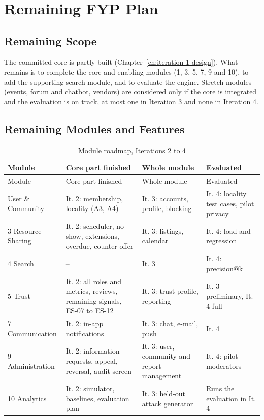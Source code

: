 \chapter{Remaining FYP Plan}\label{ch:remaining-fyp-plan}
\section{Remaining Scope}\label{sec:remaining-scope}
The committed core is partly built (Chapter~\ref{ch:iteration-1-design}). What remains is to complete the core and enabling modules (1, 3, 5, 7, 9 and 10), to add the supporting search module, and to evaluate the engine. Stretch modules (events, forum and chatbot, vendors) are considered only if the core is integrated and the evaluation is on track, at most one in Iteration 3 and none in Iteration 4.

\section{Remaining Modules and Features}\label{sec:remaining-modules-features}
\begingroup
\begin{longtable}{@{}L{115pt}L{81pt}L{81pt}L{86pt}@{}}
\caption{Module roadmap, Iterations 2 to 4}\label{tab:module-roadmap-iterations-2}\\
\toprule
Module & Core part finished & Whole module & Evaluated \\
\midrule
\endfirsthead
\toprule
Module & Core part finished & Whole module & Evaluated \\
\midrule
\endhead
\bottomrule
{} User \& Community & It. 2: membership, locality (A3, A4) & It. 3: accounts, profile, blocking & It. 4: locality test cases, pilot privacy \\
3 Resource Sharing & It. 2: scheduler, no-show, extensions, overdue, counter-offer & It. 3: listings, calendar & It. 4: load and regression \\
4 Search & -- & It. 3 & It. 4: precision@k \\
5 Trust & It. 2: all roles and metrics, reviews, remaining signals, ES-07 to ES-12 & It. 3: trust profile, reporting & It. 3 preliminary, It. 4 full \\
7 Communication & It. 2: in-app notifications & It. 3: chat, e-mail, push & It. 4 \\
9 Administration & It. 2: information requests, appeal, reversal, audit screen & It. 3: user, community and report management & It. 4: pilot moderators \\
10 Analytics & It. 2: simulator, baselines, evaluation plan & It. 3: held-out attack generator & Runs the evaluation in It. 4 \\
\end{longtable}
\endgroup
